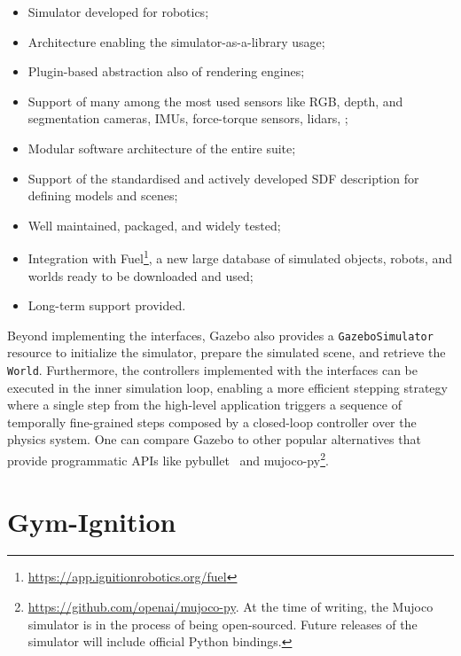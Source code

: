 \begin{itemize}
    \item Simulator developed for robotics;
    \item Architecture enabling the simulator-as-a-library usage;
    \item Plugin-based abstraction also of rendering engines;
    \item Support of many among the most used sensors like RGB, depth, and segmentation cameras, \acsp{IMU}, force-torque sensors, lidars, \etc;
    \item Modular software architecture of the entire suite;
    \item Support of the standardised and actively developed \ac{SDF} description for defining models and scenes;
    \item Well maintained, packaged, and widely tested;
    \item Integration with Fuel\footnote{\url{https://app.ignitionrobotics.org/fuel}}, a new large database of simulated objects, robots, and worlds ready to be downloaded and used;
    \item Long-term support provided.
\end{itemize}

Beyond implementing the \scenario interfaces, \scenario Gazebo also provides a \verb|GazeboSimulator| resource to initialize the simulator, prepare the simulated scene, and retrieve the \verb|World|.
Furthermore, the controllers implemented with the \scenario interfaces can be executed in the inner simulation loop, enabling a more efficient stepping strategy where a single step from the high-level application triggers a sequence of temporally fine-grained steps composed by a closed-loop controller over the physics system.
One can compare \scenario Gazebo to other popular alternatives that provide programmatic \acp{API} like pybullet~\parencite{coumans_pybullet_2016} and mujoco-py\footnote{\url{https://github.com/openai/mujoco-py}.
At the time of writing, the Mujoco simulator is in the process of being open-sourced.
Future releases of the simulator will include official Python bindings.}.

\section{Gym-Ignition}
\label{sec:gym_ignition}

